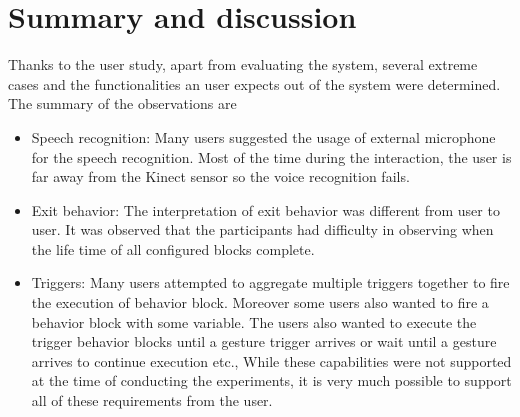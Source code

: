 \section{Summary and discussion}
Thanks to the user study, apart from evaluating the system, several extreme cases and the functionalities an user expects out of the system were determined. The summary of the observations are
\begin{itemize}
\item Speech recognition: Many users suggested the usage of external microphone for the speech recognition. Most of the time during the interaction, the user is far away from the Kinect sensor so the voice recognition fails.
\item Exit behavior: The interpretation of exit behavior was different from user to user. It was observed that the participants had difficulty in observing when the life time of all configured blocks complete.
\item Triggers: Many users attempted to aggregate multiple triggers together to fire the execution of behavior block. Moreover some users also wanted to fire a behavior block with some variable. The users also wanted to execute the trigger behavior blocks until a gesture trigger arrives or wait until a gesture arrives to continue execution etc., While these capabilities were not supported at the time of conducting the experiments, it is very much possible to support all of these requirements from the user.
\end{itemize}